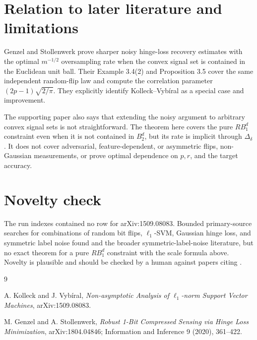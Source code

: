 \documentclass[11pt]{article}
\begin{document}
\section{Relation to later literature and limitations}

Genzel and Stollenwerk \cite{GS} prove sharper noisy hinge-loss recovery
estimates with the optimal $m^{-1/2}$ oversampling rate when the convex signal
set is contained in the Euclidean unit ball. Their Example 3.4(2) and
Proposition 3.5 cover the same independent random-flip law and compute the
correlation parameter $(2p-1)\sqrt{2/\pi}$. They explicitly identify
Kolleck--Vyb\'iral as a special case and improvement.

The supporting paper also says that extending the noisy argument to arbitrary
convex signal sets is not straightforward. The theorem here covers the pure
$RB_1^d$ constraint even when it is not contained in $B_2^d$, but its rate is
implicit through $\Delta_\delta$. It does not cover adversarial,
feature-dependent, or asymmetric flips, non-Gaussian measurements, or prove
optimal dependence on $p,r$, and the target accuracy.

\section{Novelty check}

The run indexes contained no row for arXiv:1509.08083. Bounded primary-source
searches for combinations of random bit flips, $\ell_1$-SVM, Gaussian hinge
loss, and symmetric label noise found \cite{GS} and the broader
symmetric-label-noise literature, but no exact theorem for a pure $RB_1^d$
constraint with the scale formula above. Novelty is plausible and should be
checked by a human against papers citing \cite{GS}.

\begin{thebibliography}{9}

A. Kolleck and J. Vyb\'iral,
\emph{Non-asymptotic Analysis of $\ell_1$-norm Support Vector Machines},
arXiv:1509.08083.

M. Genzel and A. Stollenwerk,
\emph{Robust 1-Bit Compressed Sensing via Hinge Loss Minimization},
arXiv:1804.04846; Information and Inference 9 (2020), 361--422.

\end{thebibliography}
\end{document}
